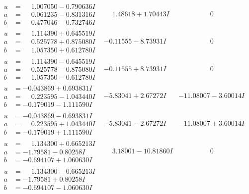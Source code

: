 \documentclass[1p]{elsarticle_modified}
\theoremstyle{definition}
\begin{document}
$$\begin{array}{c|c|c}
\begin{aligned}
u &= \phantom{-}1.007050 - 0.790636 I \\
a &= \phantom{-}0.061235 - 0.831316 I \\
b &= \phantom{-}0.477046 - 0.732746 I\end{aligned}
 & \phantom{-}1.48618 + 1.70443 I & \phantom{-0.000000 } 0 \\ \hline\begin{aligned}
u &= \phantom{-}1.114390 + 0.645519 I \\
a &= \phantom{-}0.525778 + 0.875080 I \\
b &= \phantom{-}1.057350 + 0.612780 I\end{aligned}
 & -0.11555 - 8.73931 I & \phantom{-0.000000 } 0 \\ \hline\begin{aligned}
u &= \phantom{-}1.114390 - 0.645519 I \\
a &= \phantom{-}0.525778 - 0.875080 I \\
b &= \phantom{-}1.057350 - 0.612780 I\end{aligned}
 & -0.11555 + 8.73931 I & \phantom{-0.000000 } 0 \\ \hline\begin{aligned}
u &= -0.043869 + 0.693831 I \\
a &= \phantom{-}0.223595 - 1.043440 I \\
b &= -0.179019 - 1.111590 I\end{aligned}
 & -5.83041 + 2.67272 I & -11.08007 - 3.60014 I \\ \hline\begin{aligned}
u &= -0.043869 - 0.693831 I \\
a &= \phantom{-}0.223595 + 1.043440 I \\
b &= -0.179019 + 1.111590 I\end{aligned}
 & -5.83041 - 2.67272 I & -11.08007 + 3.60014 I \\ \hline\begin{aligned}
u &= \phantom{-}1.134300 + 0.665213 I \\
a &= -1.79581 - 0.80258 I \\
b &= -0.694107 + 1.060630 I\end{aligned}
 & \phantom{-}3.18001 - 10.81860 I & \phantom{-0.000000 } 0 \\ \hline\begin{aligned}
u &= \phantom{-}1.134300 - 0.665213 I \\
a &= -1.79581 + 0.80258 I \\
b &= -0.694107 - 1.060630 I\end{aligned}

\end{array}$$
\end{document}
